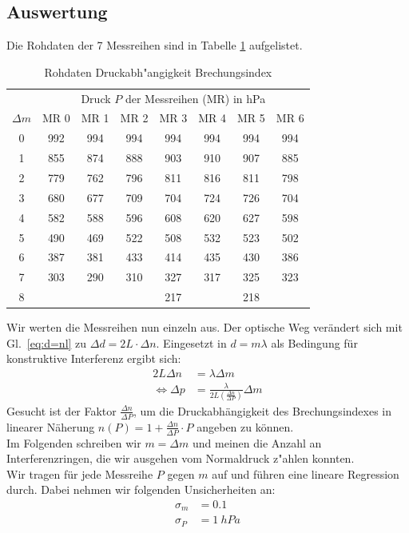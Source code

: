 \documentclass[12pt,a4paper]{article}
\begin{document}
\subsection{Auswertung}
Die Rohdaten der 7 Messreihen sind in Tabelle \ref{table:RohdatenDruck} aufgelistet.
\begin{table}[H]
	\centering
	\begin{tabular}{|c|c|c|c|c|c|c|c|}
		\hline
		&\multicolumn{7}{c|}{Druck $P$ der Messreihen (MR) in hPa}\\
		$\Delta m$&MR 0&MR 1&MR 2&MR 3&MR 4&MR 5&MR 6\\
		\hline
		0&992&994&994&994&994&994&994\\
		1&855&874&888&903&910&907&885\\
		2&779&762&796&811&816&811&798\\
		3&680&677&709&704&724&726&704\\
		4&582&588&596&608&620&627&598\\
		5&490&469&522&508&532&523&502\\
		6&387&381&433&414&435&430&386\\
		7&303&290&310&327&317&325&323\\
		8&&&&217&&218&\\
		\hline
	\end{tabular}
	\caption{Rohdaten Druckabh"angigkeit Brechungsindex}
	\label{table:RohdatenDruck}
\end{table}
Wir werten die Messreihen nun einzeln aus.
Der optische Weg verändert sich mit Gl.~\eqref{eq:d=nl} zu $\Delta d=2L\cdot\Delta n$. Eingesetzt in $d=m\lambda$ als Bedingung für konstruktive Interferenz ergibt sich:
\begin{align}
2L\Delta n&=\lambda\Delta m\nonumber\\
\Leftrightarrow\Delta p&=\frac{\lambda}{2L(\frac{\Delta n}{\Delta P})}\Delta m
\end{align}
Gesucht ist der Faktor $\frac{\Delta n}{\Delta P}$, um die Druckabhängigkeit des Brechungsindexes in linearer Näherung $n(P)=1+\frac{\Delta n}{\Delta P}\cdot P$ angeben zu können.\\
Im Folgenden schreiben wir $m=\Delta m$ und meinen die Anzahl an Interferenzringen, die wir ausgehen vom Normaldruck z"ahlen konnten.\\
Wir tragen für jede Messreihe $P$ gegen $m$ auf und führen eine lineare Regression durch. Dabei nehmen wir folgenden Unsicherheiten an:
\begin{align}
\sigma_{m}&=0.1\\
\sigma_{P}&=1\ hPa
\end{align}
\end{document}
